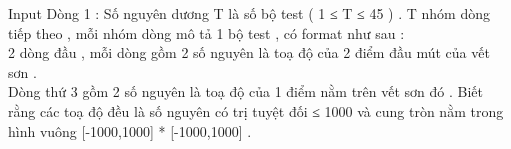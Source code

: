 Input
Dòng 1 : Số nguyên dương T là số bộ test ( 1 ≤ T ≤ 45 ) . T nhóm dòng tiếp theo , mỗi nhóm dòng mô tả 1 bộ test , có format như sau :   
\\   2 dòng đầu , mỗi dòng gồm 2 số nguyên là toạ độ của 2 điểm đầu mút của vết sơn .   
\\   Dòng thứ 3 gồm 2 số nguyên là toạ độ của 1 điểm nằm trên vết sơn đó . Biết rằng các toạ độ đều là số nguyên có trị tuyệt đối ≤ 1000 và cung tròn nằm trong hình vuông [-1000,1000] * [-1000,1000] .